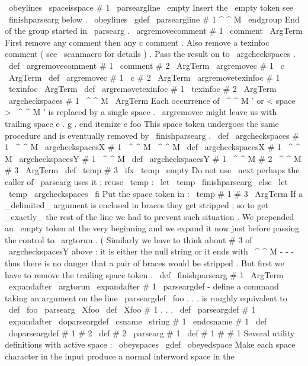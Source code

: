 {{\
obeylines
\
spaceisspace
#
1
%
\
parseargline
\
empty
%
Insert
the
\
empty
token
see
\
finishparsearg
below
.
}
{
\
obeylines
%
\
gdef
\
parseargline
#
1
^
^
M
{
%
\
endgroup
%
End
of
the
group
started
in
\
parsearg
.
\
argremovecomment
#
1
\
comment
\
ArgTerm
%
}
%
}
%
First
remove
any
comment
then
any
c
comment
.
Also
remove
a
texinfoc
%
comment
(
see
\
scanmacro
for
details
)
.
Pass
the
result
on
to
\
argcheckspaces
.
\
def
\
argremovecomment
#
1
\
comment
#
2
\
ArgTerm
{
\
argremovec
#
1
\
c
\
ArgTerm
}
\
def
\
argremovec
#
1
\
c
#
2
\
ArgTerm
{
\
argremovetexinfoc
#
1
\
texinfoc
\
ArgTerm
}
\
def
\
argremovetexinfoc
#
1
\
texinfoc
#
2
\
ArgTerm
{
\
argcheckspaces
#
1
\
^
^
M
\
ArgTerm
}
%
Each
occurrence
of
\
^
^
M
'
or
<
space
>
\
^
^
M
'
is
replaced
by
a
single
space
.
%
%
\
argremovec
might
leave
us
with
trailing
space
e
.
g
.
%
end
itemize
c
foo
%
This
space
token
undergoes
the
same
procedure
and
is
eventually
removed
%
by
\
finishparsearg
.
%
\
def
\
argcheckspaces
#
1
\
^
^
M
{
\
argcheckspacesX
#
1
\
^
^
M
\
^
^
M
}
\
def
\
argcheckspacesX
#
1
\
^
^
M
{
\
argcheckspacesY
#
1
\
^
^
M
}
\
def
\
argcheckspacesY
#
1
\
^
^
M
#
2
\
^
^
M
#
3
\
ArgTerm
{
%
\
def
\
temp
{
#
3
}
%
\
ifx
\
temp
\
empty
%
Do
not
use
\
next
perhaps
the
caller
of
\
parsearg
uses
it
;
reuse
\
temp
:
\
let
\
temp
\
finishparsearg
\
else
\
let
\
temp
\
argcheckspaces
\
fi
%
Put
the
space
token
in
:
\
temp
#
1
#
3
\
ArgTerm
}
%
If
a
_delimited_
argument
is
enclosed
in
braces
they
get
stripped
;
so
%
to
get
_exactly_
the
rest
of
the
line
we
had
to
prevent
such
situation
.
%
We
prepended
an
\
empty
token
at
the
very
beginning
and
we
expand
it
now
%
just
before
passing
the
control
to
\
argtorun
.
%
(
Similarly
we
have
to
think
about
#
3
of
\
argcheckspacesY
above
:
it
is
%
either
the
null
string
or
it
ends
with
\
^
^
M
-
-
-
thus
there
is
no
danger
%
that
a
pair
of
braces
would
be
stripped
.
%
%
But
first
we
have
to
remove
the
trailing
space
token
.
%
\
def
\
finishparsearg
#
1
\
ArgTerm
{
\
expandafter
\
argtorun
\
expandafter
{
#
1
}
}
%
\
parseargdef
-
define
a
command
taking
an
argument
on
the
line
%
%
\
parseargdef
\
foo
{
.
.
.
}
%
is
roughly
equivalent
to
%
\
def
\
foo
{
\
parsearg
\
Xfoo
}
%
\
def
\
Xfoo
#
1
{
.
.
.
}
\
def
\
parseargdef
#
1
{
%
\
expandafter
\
doparseargdef
\
csname
\
string
#
1
\
endcsname
#
1
%
}
\
def
\
doparseargdef
#
1
#
2
{
%
\
def
#
2
{
\
parsearg
#
1
}
%
\
def
#
1
#
#
1
%
}
%
Several
utility
definitions
with
active
space
:
{
\
obeyspaces
\
gdef
\
obeyedspace
{
}
%
Make
each
space
character
in
the
input
produce
a
normal
interword
%
space
in
the
}}
